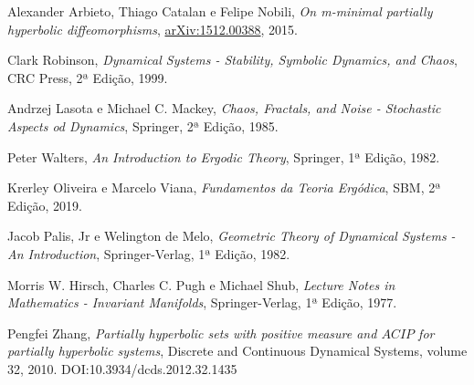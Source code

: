 %

\begin{thebibliography}{1} 


 Alexander Arbieto, Thiago Catalan e Felipe Nobili, \emph{On m-minimal partially hyperbolic diffeomorphisms}, \url{arXiv:1512.00388}, 2015.

 Clark Robinson, \emph{Dynamical Systems - Stability, Symbolic Dynamics, and Chaos}, CRC Press, 2ª Edição, 1999.

 Andrzej Lasota e Michael C. Mackey, \emph{Chaos, Fractals, and Noise - Stochastic Aspects od Dynamics}, Springer, 2ª Edição, 1985.

 Peter Walters, \emph{An Introduction to Ergodic Theory}, Springer, 1ª Edição, 1982.

 Krerley Oliveira e Marcelo Viana, \emph{Fundamentos da Teoria Ergódica}, SBM, 2ª Edição, 2019.

 Jacob Palis, Jr e Welington de Melo, \emph{Geometric Theory of Dynamical Systems - An Introduction}, Springer-Verlag, 1ª Edição, 1982.

 Morris W. Hirsch, Charles C. Pugh e Michael Shub, \emph{Lecture Notes in Mathematics - Invariant Manifolds}, Springer-Verlag, 1ª Edição, 1977.

 Pengfei Zhang, \emph{Partially hyperbolic sets with positive measure and $ACIP$ for partially hyperbolic systems}, Discrete and Continuous Dynamical Systems, volume 32, 2010. DOI:10.3934/dcds.2012.32.1435

\end{thebibliography}

%